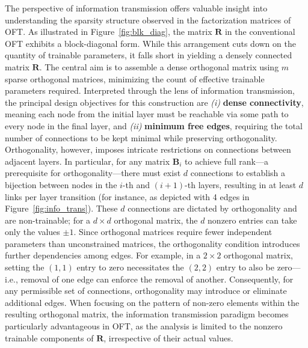 The perspective of information transmission offers valuable insight into understanding the sparsity structure observed in the factorization matrices of OFT. As illustrated in Figure~\ref{fig:blk_diag}, the matrix $\bm{R}$ in the conventional OFT exhibits a block-diagonal form. While this arrangement cuts down on the quantity of trainable parameters, it falls short in yielding a densely connected matrix $\bm{R}$. The central aim is to assemble a dense orthogonal matrix using $m$ sparse orthogonal matrices, minimizing the count of effective trainable parameters required. Interpreted through the lens of information transmission, the principal design objectives for this construction are \emph{(i)} \textbf{dense connectivity}, meaning each node from the initial layer must be reachable via some path to every node in the final layer, and \emph{(ii)} \textbf{minimum free edges}, requiring the total number of connections to be kept minimal while preserving orthogonality. Orthogonality, however, imposes intricate restrictions on connections between adjacent layers. In particular, for any matrix $\bm{B}_i$ to achieve full rank—a prerequisite for orthogonality—there must exist $d$ connections to establish a bijection between nodes in the $i$-th and $(i+1)$-th layers, resulting in at least $d$ links per layer transition (for instance, as depicted with 4 edges in Figure~\ref{fig:info_trans}). These $d$ connections are dictated by orthogonality and are non-trainable; for a $d\times d$ orthogonal matrix, the $d$ nonzero entries can take only the values $\pm 1$. Since orthogonal matrices require fewer independent parameters than unconstrained matrices, the orthogonality condition introduces further dependencies among edges. For example, in a $2\times 2$ orthogonal matrix, setting the $(1,1)$ entry to zero necessitates the $(2,2)$ entry to also be zero—i.e., removal of one edge can enforce the removal of another. Consequently, for any permissible set of connections, orthogonality may introduce or eliminate additional edges. When focusing on the pattern of non-zero elements within the resulting orthogonal matrix, the information transmission paradigm becomes particularly advantageous in OFT, as the analysis is limited to the nonzero trainable components of $\bm{R}$, irrespective of their actual values.

